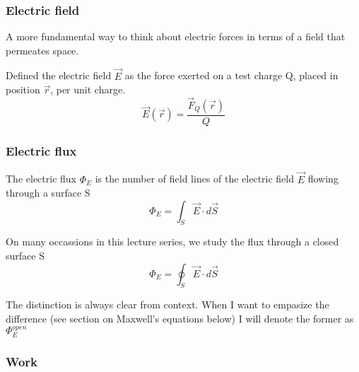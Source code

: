 \documentclass[english,11pt]{article}
\begin{document}
\subsubsection*{\bf Electric field}
        \begin{itemize}
        {\small
           \item A more fundamental way to think about electric forces in terms of a field that permeates space.
           \item Defined the electric field $\vec{E}$
                 as the force exerted on a test charge Q, placed in position $\vec{r}$, per unit charge.
            \begin{equation*}
              \vec{E}(\vec{r}) = \frac{\vec{F}_Q(\vec{r})}{Q}
            \end{equation*}
        }
        \end{itemize}

\subsubsection*{\bf Electric flux}
          \begin{itemize}
          {\small
             \item The electric flux $\Phi_E$ is the number of field lines of the electric field $\vec{E}$
                   flowing through a surface S
                \begin{equation*}
                  \Phi_E = \int_{S} \vec{E} \cdot d\vec{S}
                \end{equation*}
            \item On many occassions in this lecture series, we study the flux through a closed surface S
                \begin{equation*}
                  \Phi_E = \oint_{S} \vec{E} \cdot d\vec{S}
                \end{equation*}
            \item The distinction is always clear from context. When I want to empasize the difference
                  (see section on Maxwell's equations below) I will denote the former as $\Phi^{open}_{E}$
          }
          \end{itemize}


\subsubsection*{\bf Work}
\end{document}
